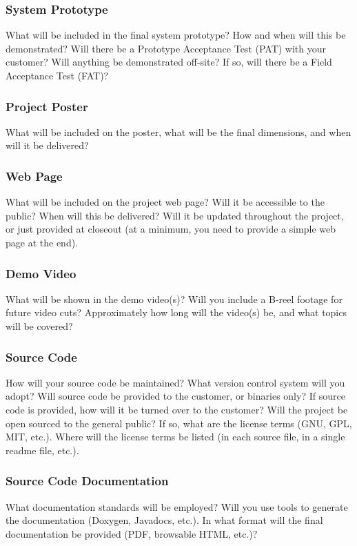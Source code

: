 \subsubsection{System Prototype}
What will be included in the final system prototype? How and when will this be demonstrated? Will there be a Prototype Acceptance Test (PAT) with your customer? Will anything be demonstrated off-site? If so, will there be a Field Acceptance Test (FAT)?

\subsubsection{Project Poster}
What will be included on the poster, what will be the final dimensions, and when will it be delivered?

\subsubsection{Web Page}
What will be included on the project web page? Will it be accessible to the public? When will this be delivered? Will it be updated throughout the project, or just provided at closeout (at a minimum, you need to provide a simple web page at the end).

\subsubsection{Demo Video}
What will be shown in the demo video(s)? Will you include a B-reel footage for future video cuts? Approximately how long will the video(s) be, and what topics will be covered?

\subsubsection{Source Code}
How will your source code be maintained? What version control system will you adopt? Will source code be provided to the customer, or binaries only? If source code is provided, how will it be turned over to the customer? Will the project be open sourced to the general public? If so, what are the license terms (GNU, GPL, MIT, etc.). Where will the license terms be listed (in each source file, in a single readme file, etc.).

\subsubsection{Source Code Documentation}
What documentation standards will be employed? Will you use tools to generate the documentation (Doxygen, Javadocs, etc.). In what format will the final documentation be provided (PDF, browsable HTML, etc.)?

